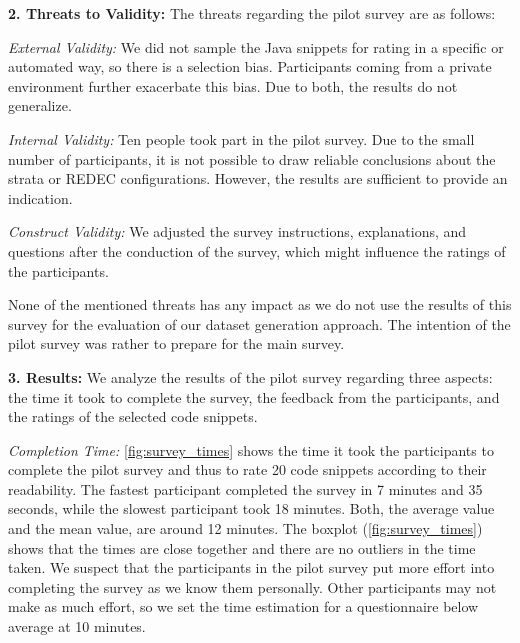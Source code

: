\documentclass[%
class=scrreprt,
chapterprefix=false,%
open=right,%
twoside=true,%
paper=a4,%
logofile={Logo\_zentral\_farbig\_EN.png},%
thesistype=master,%
UKenglish,%
]{se2thesis}
\theoremstyle{definition}
\newcommand{\rdh}{REDEC\xspace}
\begin{document}
	\textbf{2. Threats to Validity:}
	The threats regarding the pilot survey are as follows:
	
	\textit{External Validity:}
	We did not sample the Java snippets for rating in a specific or automated way, so there is a selection bias. Participants coming from a private environment further exacerbate this bias. Due to both, the results do not generalize.
	
	\textit{Internal Validity:}	
	Ten people took part in the pilot survey. Due to the small number of participants, it is not possible to draw reliable conclusions about the strata or \rdh configurations. 	
	However, the results are sufficient to provide an indication.
	
	\textit{Construct Validity:}
	We adjusted the survey instructions, explanations, and questions after the conduction of the survey, which might influence the ratings of the participants.
	
	None of the mentioned threats has any impact as we do not use the results of this survey for the evaluation of our dataset generation approach.
	The intention of the pilot survey was rather to prepare for the main survey.
	
	\textbf{3. Results:}
	We analyze the results of the pilot survey regarding three aspects: the time it took to complete the survey, the feedback from the participants, and the ratings of the selected code snippets.
	
	\textit{Completion Time:} 
	\autoref{fig:survey_times} shows the time it took the participants to complete the pilot survey and thus to rate 20 code snippets according to their readability.
	The fastest participant completed the survey in 7 minutes and 35 seconds, while the slowest participant took 18 minutes. 
	Both, the average value and the mean value, are around 12 minutes. The boxplot (\autoref{fig:survey_times}) shows that the times are close together and there are no outliers in the time taken.
	We suspect that the participants in the pilot survey put more effort into completing the survey as we know them personally. 
	Other participants may not make as much effort, so we set the time estimation for a questionnaire below average at 10 minutes.
		
\end{document}
